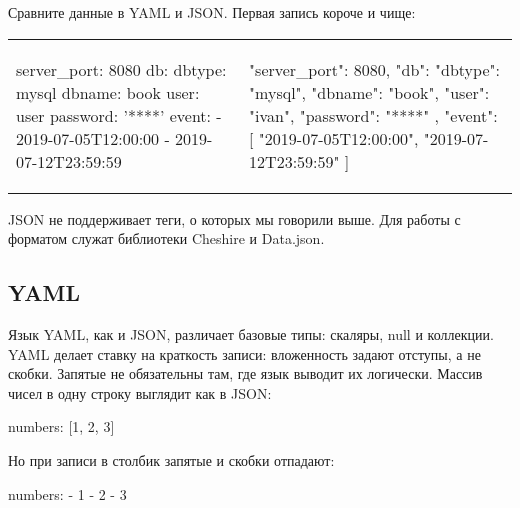 Сравните данные в YAML и JSON. Первая запись короче и чище:

\noindent
\begin{tabular}{ @{}p{5cm} @{}p{5cm} }

\begin{english}
  \begin{yaml}
server_port: 8080
db:
  dbtype:   mysql
  dbname:   book
  user:     user
  password: '****'
event:
  - 2019-07-05T12:00:00
  - 2019-07-12T23:59:59
  \end{yaml}
\end{english}

&

\begin{english}
  \begin{json}
{
    "server_port": 8080,
    "db": {
        "dbtype":   "mysql",
        "dbname":   "book",
        "user":     "ivan",
        "password": "****"
    },
    "event": [
        "2019-07-05T12:00:00",
        "2019-07-12T23:59:59"
    ]
}
  \end{json}
\end{english}

\end{tabular}

JSON не поддерживает теги, о которых мы говорили выше. Для работы с форматом
служат библиотеки Cheshire и
Data.json.

\subsection{YAML}

Язык YAML, как и JSON, различает базовые типы: скаляры, null и коллекции. YAML
делает ставку на краткость записи: вложенность задают отступы, а не
скобки. Запятые не обязательны там, где язык выводит их логически. Массив чисел
в одну строку выглядит как в JSON:

\begin{english}
  \begin{yaml}
numbers: [1, 2, 3]
  \end{yaml}
\end{english}

\noindent
Но при записи в столбик запятые и скобки отпадают:

\begin{english}
  \begin{yaml}
numbers:
  - 1
  - 2
  - 3
  \end{yaml}
\end{english}

